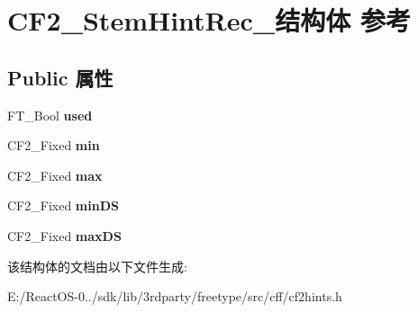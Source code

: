 \hypertarget{struct_c_f2___stem_hint_rec__}{}\section{C\+F2\+\_\+\+Stem\+Hint\+Rec\+\_\+结构体 参考}
\label{struct_c_f2___stem_hint_rec__}
\subsection*{Public 属性}
\begin{DoxyCompactItemize}
\item 
\mbox{\label{struct_c_f2___stem_hint_rec___ac01ba4764ab9fcebfa3023645e9745d4}} 
F\+T\+\_\+\+Bool {\bfseries used}
\item 
\mbox{\label{struct_c_f2___stem_hint_rec___a4d81992a6202dba0105a2db9fac11ddc}} 
C\+F2\+\_\+\+Fixed {\bfseries min}
\item 
\mbox{\label{struct_c_f2___stem_hint_rec___a50a08415026879df566abc0ad5e4a7fe}} 
C\+F2\+\_\+\+Fixed {\bfseries max}
\item 
\mbox{\label{struct_c_f2___stem_hint_rec___ae693d6d9a52acee231cf46218266d661}} 
C\+F2\+\_\+\+Fixed {\bfseries min\+DS}
\item 
\mbox{\label{struct_c_f2___stem_hint_rec___a2e1d1e0e14390a433ffce68fda0a2901}} 
C\+F2\+\_\+\+Fixed {\bfseries max\+DS}
\end{DoxyCompactItemize}


该结构体的文档由以下文件生成\+:\begin{DoxyCompactItemize}
\item 
E\+:/\+React\+O\+S-\/0../sdk/lib/3rdparty/freetype/src/cff/cf2hints.\+h\end{DoxyCompactItemize}
